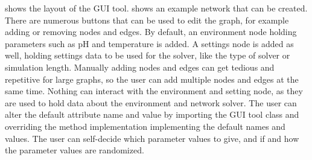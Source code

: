  shows the layout of the GUI tool.  shows an example network that can be created.
There are numerous buttons that can be used to edit the graph, for example adding or removing nodes and edges. 
By default, an environment node holding parameters such as pH and temperature is added.
A settings node is added as well, holding settings data to be used for the solver, like the type of solver or simulation length.
Manually adding nodes and edges can get tedious and repetitive for large graphs, so the user can add multiple nodes and edges at the same time.
Nothing can interact with the environment and setting node, as they are used to hold data about the environment and network solver.
The user can alter the default attribute name and value by importing the GUI tool class and overriding the method implementation implementing the default names and values. 
The user can self-decide which parameter values to give, and if and how the parameter values are randomized. 

